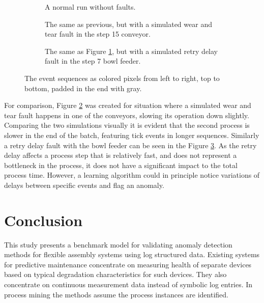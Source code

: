 \documentclass[procedia]{easychair}
\begin{document}
\begin{figure}[b]
\begin{subfigure}[h]{0.32\linewidth}
 \resizebox{\linewidth}{!}{}
 \caption{A normal run without faults.\newline\newline}
 \label{figure:output_easy}
\end{subfigure}
\begin{subfigure}[h]{0.32\linewidth}
 \resizebox{\linewidth}{!}{}
 \caption{The same as previous, but with a simulated wear and tear fault in the step 15 conveyor.}
 \label{figure:output_easy_wear_and_tear}
\end{subfigure}
\begin{subfigure}[h]{0.32\linewidth}
 \resizebox{\linewidth}{!}{}
 \caption{The same as Figure \ref{figure:output_easy}, but with a simulated retry delay fault in the step 7 bowl feeder.}
 \label{figure:output_easy_retry_delay}
\end{subfigure}
 \caption{The event sequences as colored pixels from left to right, top to bottom, padded in the end with gray.}
 \label{figure:output_images}
\end{figure}

For comparison, Figure \ref{figure:output_easy_wear_and_tear} was
created for situation where a simulated wear and tear fault happens in one of the conveyors, slowing its operation down slightly. Comparing the two simulations visually it is evident that the second process
is slower in the end of the batch, featuring tick events in longer sequences.
Similarly a retry delay fault with the bowl feeder can be seen in the Figure \ref{figure:output_easy_retry_delay}. As the retry delay affects a process step that is relatively fast, and does not 
represent a bottleneck in the process, it does not have a significant impact to the total process time. However, a learning algorithm could in principle notice variations of delays between specific events
and flag an anomaly.

\section{Conclusion}

This study presents a benchmark model for validating anomaly detection methods for flexible assembly systems using log structured data.
Existing systems for predictive maintenance concentrate on measuring health of separate devices based on typical degradation characteristics
for such devices. They also concentrate on continuous measurement data instead of symbolic log entries. In process mining the methods assume the process instances are identified.
\end{document}
